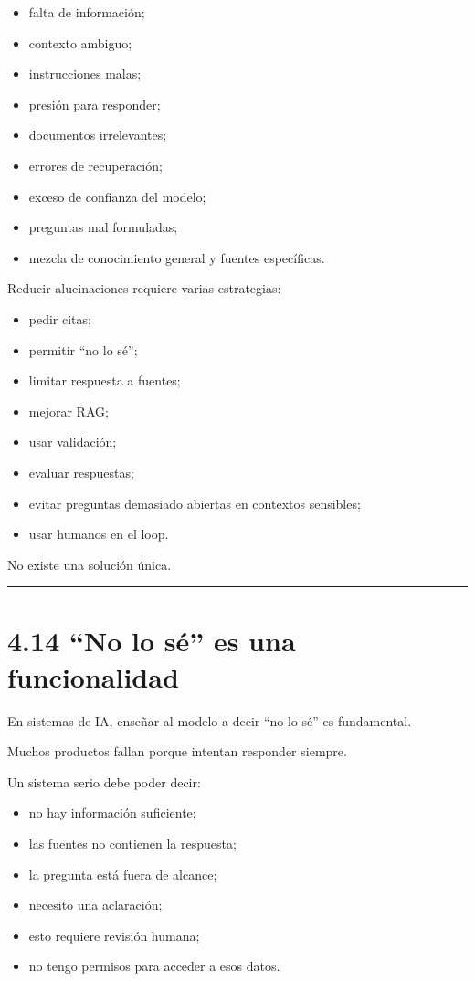 \begin{itemize}
\tightlist
\item
  falta de información;
\item
  contexto ambiguo;
\item
  instrucciones malas;
\item
  presión para responder;
\item
  documentos irrelevantes;
\item
  errores de recuperación;
\item
  exceso de confianza del modelo;
\item
  preguntas mal formuladas;
\item
  mezcla de conocimiento general y fuentes específicas.
\end{itemize}

Reducir alucinaciones requiere varias estrategias:

\begin{itemize}
\tightlist
\item
  pedir citas;
\item
  permitir ``no lo sé'';
\item
  limitar respuesta a fuentes;
\item
  mejorar RAG;
\item
  usar validación;
\item
  evaluar respuestas;
\item
  evitar preguntas demasiado abiertas en contextos sensibles;
\item
  usar humanos en el loop.
\end{itemize}

No existe una solución única.

\begin{center}\rule{0.5\linewidth}{0.5pt}\end{center}

\section{4.14 ``No lo sé'' es una
funcionalidad}\label{no-lo-suxe9-es-una-funcionalidad}

En sistemas de IA, enseñar al modelo a decir ``no lo sé'' es
fundamental.

Muchos productos fallan porque intentan responder siempre.

Un sistema serio debe poder decir:

\begin{itemize}
\tightlist
\item
  no hay información suficiente;
\item
  las fuentes no contienen la respuesta;
\item
  la pregunta está fuera de alcance;
\item
  necesito una aclaración;
\item
  esto requiere revisión humana;
\item
  no tengo permisos para acceder a esos datos.
\end{itemize}

